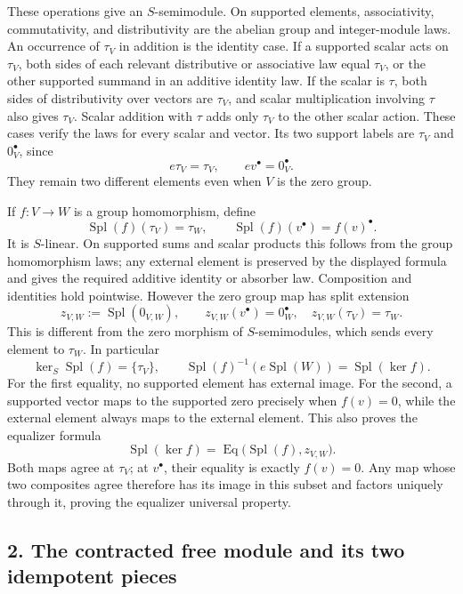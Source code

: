 \documentclass[
]{article}
\begin{document}
These operations give an \(S\)-semimodule. On supported elements,
associativity, commutativity, and distributivity are the abelian group
and integer-module laws. An occurrence of \(\tau_V\) in addition is the
identity case. If a supported scalar acts on \(\tau_V\), both sides of
each relevant distributive or associative law equal \(\tau_V\), or the
other supported summand in an additive identity law. If the scalar is
\(\tau\), both sides of distributivity over vectors are \(\tau_V\), and
scalar multiplication involving \(\tau\) also gives \(\tau_V\). Scalar
addition with \(\tau\) adds only \(\tau_V\) to the other scalar action.
These cases verify the laws for every scalar and vector. Its two support
labels are \(\tau_V\) and \(0_V^\bullet\), since \[
e\tau_V=\tau_V,\qquad ev^\bullet=0_V^\bullet.
\tag{Q3}
\] They remain two different elements even when \(V\) is the zero group.

If \(f:V\to W\) is a group homomorphism, define \[
\operatorname{Spl}(f)(\tau_V)=\tau_W,
\qquad\operatorname{Spl}(f)(v^\bullet)=f(v)^\bullet.
\tag{Q4}
\] It is \(S\)-linear. On supported sums and scalar products this
follows from the group homomorphism laws; any external element is
preserved by the displayed formula and gives the required additive
identity or absorber law. Composition and identities hold pointwise.
However the zero group map has split extension \[
z_{V,W}:=\operatorname{Spl}(0_{V,W}),\qquad
z_{V,W}(v^\bullet)=0_W^\bullet,\quad
z_{V,W}(\tau_V)=\tau_W.
\tag{Q5}
\] This is different from the zero morphism of \(S\)-semimodules, which
sends every element to \(\tau_W\). In particular \[
\ker_S\operatorname{Spl}(f)=\{\tau_V\},
\qquad
\operatorname{Spl}(f)^{-1}(e\operatorname{Spl}(W))
=\operatorname{Spl}(\ker f).
\tag{Q6}
\] For the first equality, no supported element has external image. For
the second, a supported vector maps to the supported zero precisely when
\(f(v)=0\), while the external element always maps to the external
element. This also proves the equalizer formula \[
\operatorname{Spl}(\ker f)
=\operatorname{Eq}\bigl(\operatorname{Spl}(f),z_{V,W}\bigr).
\tag{Q7}
\] Both maps agree at \(\tau_V\); at \(v^\bullet\), their equality is
exactly \(f(v)=0\). Any map whose two composites agree therefore has its
image in this subset and factors uniquely through it, proving the
equalizer universal property.

\subsection{2. The contracted free module and its two idempotent
pieces}\label{the-contracted-free-module-and-its-two-idempotent-pieces}
\end{document}
